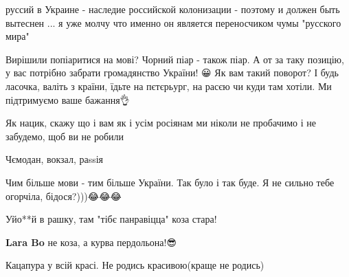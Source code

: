 \begin{itemize}
руссий в Украине - наследие российской колонизации - поэтому и должен быть вытеснен ... я уже молчу что именно он является переносчиком чумы "русского мира"


Вирішили попіаритися на мові? Чорний піар - також піар. А от за таку позицію, у вас потрібно забрати громадянство України! 😀 Як вам такий поворот?
І будь ласочка, валіть з країни, їдьте на пєтєрьург, на расєю чи куди там хотіли. Ми підтримуємо ваше бажання👌


Як нацик, скажу що і вам як і усім росіянам ми ніколи не пробачимо і не забудемо, щоб ви не робили


Чємодан, вокзал, раssія


Чим більше мови - тим більше України. Так було і так буде. Я не сильно тебе огорчіла, бідося?)))😂😂😂💙💛


Уйо**й в рашку, там "тібє панравіцца" коза стара!

\begin{itemize}

\textbf{Lara Bo} не коза, а курва пердольона!😎
\end{itemize}


Кацапура у всій красі. Не родись красивою(краще не родись)



\end{itemize}
